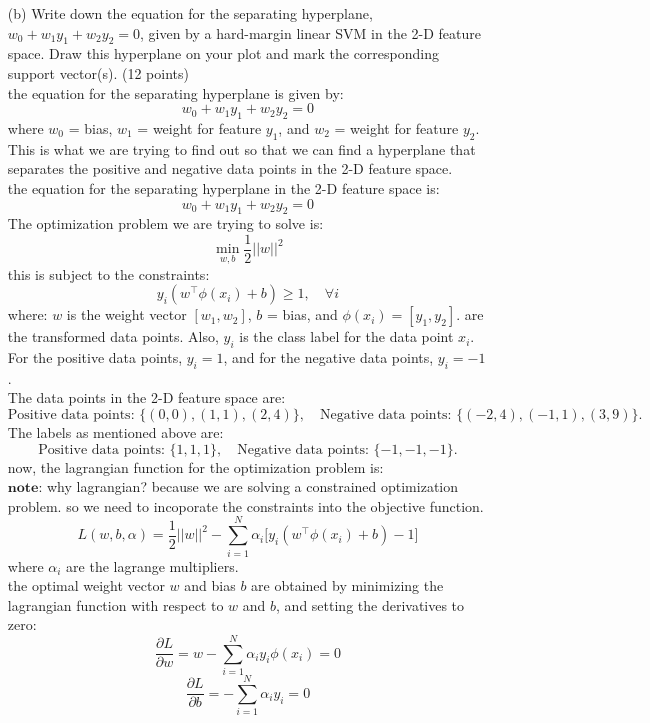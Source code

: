 \documentclass[a3paper,12pt]{article} %
\begin{document}
\begin{enumerate}
    \item[(b)] Write down the equation for the separating hyperplane, 
    \(
    w_0 + w_1y_1 + w_2y_2 = 0
    \),
    given by a hard-margin linear SVM in the 2-D feature space. Draw this hyperplane on your plot and mark the corresponding support vector(s). \hfill (12 points)
    \\ the equation for the separating hyperplane is given by:
    \[
    w_0 + w_1y_1 + w_2y_2 = 0
    \]
    where \(w_0\) = bias, \(w_1\) = weight for feature \(y_1\), and \(w_2\) = weight for feature \(y_2\). This is what we are trying to find out so that we can find a hyperplane that separates the positive and negative data points in the 2-D feature space.
    \\ the equation for the separating hyperplane in the 2-D feature space is:
    \[
    w_0 + w_1y_1 + w_2y_2 = 0
    \]
    The optimization problem we are trying to solve is:
    \[
    \min_{w, b} \frac{1}{2} ||w||^2
    \]
    this is subject to the constraints:
    \[
    y_i(w^\top \phi(x_i) + b) \geq 1, \quad \forall i
    \]
    where:
    \(w\) is the weight vector \([w_1, w_2]\), \(b\) = bias, and \(\phi(x_i) = [y_1, y_2]\). are the transformed data points. Also, \(y_i\) is the class label for the data point \(x_i\). For the positive data points, \(y_i = 1\), and for the negative data points, \(y_i = -1\).
    \\ The data points in the 2-D feature space are:
    \[
    \text{Positive data points: } \{(0, 0), (1, 1), (2, 4)\}, \quad \text{Negative data points: } \{(-2, 4), (-1, 1), (3, 9)\}.
    \]
    The labels as mentioned above are:
    \[
    \text{Positive data points: } \{1, 1, 1\}, \quad \text{Negative data points: } \{-1, -1, -1\}.
    \]
    now, the lagrangian function for the optimization problem is:
    \\ \(\textbf{note:}\) why lagrangian? because we are solving a constrained optimization problem. so we need to incoporate the constraints into the objective function.
    \[
    L(w, b, \alpha) = \frac{1}{2} ||w||^2 - \sum^N_{i=1} \alpha_i \big[y_i(w^\top \phi(x_i) + b) - 1\big]
    \]
    where \(\alpha_i\) are the lagrange multipliers.
    \\ the optimal weight vector \(w\) and bias \(b\) are obtained by minimizing the lagrangian function with respect to \(w\) and \(b\), and setting the derivatives to zero:
    \[
    \frac{\partial L}{\partial w} = w - \sum^N_{i=1} \alpha_i y_i \phi(x_i) = 0
    \]
    \[
    \frac{\partial L}{\partial b} = -\sum^N_{i=1} \alpha_i y_i = 0
\]
\end{enumerate}
\end{document}
